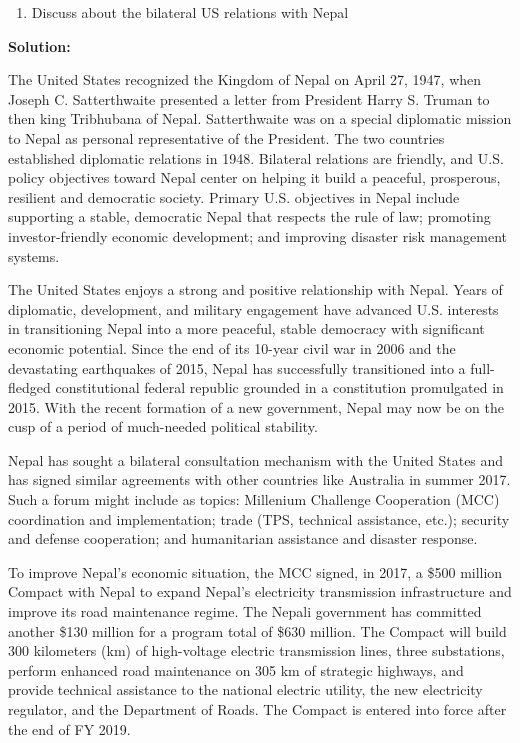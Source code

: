 \documentclass[
  openany]{book}
\providecommand{\tightlist}{%
  \setlength{\itemsep}{0pt}\setlength{\parskip}{0pt}}
\begin{document}
\begin{enumerate}
\def\labelenumi{\arabic{enumi}.}
\setcounter{enumi}{1}
\tightlist
\item
  Discuss about the bilateral US relations with Nepal
\end{enumerate}

\textbf{Solution:}

The United States recognized the Kingdom of Nepal on April 27, 1947, when Joseph C. Satterthwaite presented a letter from President Harry S. Truman to then king Tribhubana of Nepal. Satterthwaite was on a special diplomatic mission to Nepal as personal representative of the President. The two countries established diplomatic relations in 1948. Bilateral relations are friendly, and U.S. policy objectives toward Nepal center on helping it build a peaceful, prosperous, resilient and democratic society. Primary U.S. objectives in Nepal include supporting a stable, democratic Nepal that respects the rule of law; promoting investor-friendly economic development; and improving disaster risk management systems.

The United States enjoys a strong and positive relationship with Nepal. Years of diplomatic, development, and military engagement have advanced U.S. interests in transitioning Nepal into a more peaceful, stable democracy with significant economic potential. Since the end of its 10-year civil war in 2006 and the devastating earthquakes of 2015, Nepal has successfully transitioned into a full-fledged constitutional federal republic grounded in a constitution promulgated in 2015. With the recent formation of a new government, Nepal may now be on the cusp of a period of much-needed political stability.

Nepal has sought a bilateral consultation mechanism with the United States and has signed similar agreements with other countries like Australia in summer 2017. Such a forum might include as topics: Millenium Challenge Cooperation (MCC) coordination and implementation; trade (TPS, technical assistance, etc.); security and defense cooperation; and humanitarian assistance and disaster response.

To improve Nepal's economic situation, the MCC signed, in 2017, a \$500 million Compact with Nepal to expand Nepal's electricity transmission infrastructure and improve its road maintenance regime. The Nepali government has committed another \$130 million for a program total of \$630 million. The Compact will build 300 kilometers (km) of high-voltage electric transmission lines, three substations, perform enhanced road maintenance on 305 km of strategic highways, and provide technical assistance to the national electric utility, the new electricity regulator, and the Department of Roads. The Compact is entered into force after the end of FY 2019.
\end{document}
